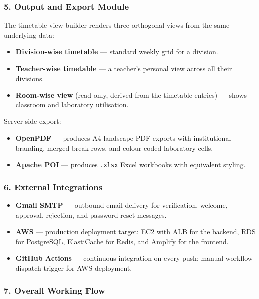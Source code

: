 \subsubsection{5. Output and Export Module}

The timetable view builder renders three orthogonal views from the same underlying data:
\begin{itemize}
    \item \textbf{Division-wise timetable} --- standard weekly grid for a division.
    \item \textbf{Teacher-wise timetable} --- a teacher's personal view across all their divisions.
    \item \textbf{Room-wise view} (read-only, derived from the timetable entries) --- shows classroom and laboratory utilisation.
\end{itemize}

Server-side export:
\begin{itemize}
    \item \textbf{OpenPDF} --- produces A4 landscape PDF exports with institutional branding, merged break rows, and colour-coded laboratory cells.
    \item \textbf{Apache POI} --- produces \texttt{.xlsx} Excel workbooks with equivalent styling.
\end{itemize}

\subsubsection{6. External Integrations}

\begin{itemize}
    \item \textbf{Gmail SMTP} --- outbound email delivery for verification, welcome, approval, rejection, and password-reset messages.
    \item \textbf{AWS} --- production deployment target: EC2 with ALB for the backend, RDS for PostgreSQL, ElastiCache for Redis, and Amplify for the frontend.
    \item \textbf{GitHub Actions} --- continuous integration on every push; manual workflow-dispatch trigger for AWS deployment.
\end{itemize}

\subsubsection{7. Overall Working Flow}

